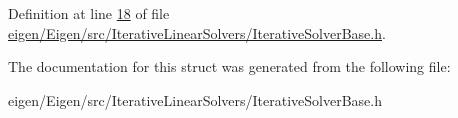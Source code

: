 Definition at line \hyperlink{eigen_2_eigen_2src_2_iterative_linear_solvers_2_iterative_solver_base_8h_source_l00018}{18} of file \hyperlink{eigen_2_eigen_2src_2_iterative_linear_solvers_2_iterative_solver_base_8h_source}{eigen/\+Eigen/src/\+Iterative\+Linear\+Solvers/\+Iterative\+Solver\+Base.\+h}.



The documentation for this struct was generated from the following file\+:\begin{DoxyCompactItemize}
\item 
eigen/\+Eigen/src/\+Iterative\+Linear\+Solvers/\+Iterative\+Solver\+Base.\+h\end{DoxyCompactItemize}
